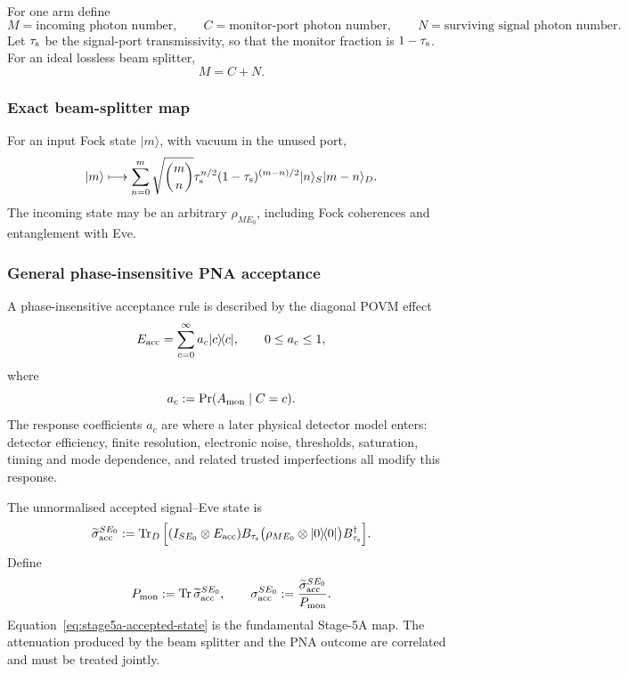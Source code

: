 \documentclass[11pt]{article}
\theoremstyle{remark}
\begin{document}
For one arm define
\[
    M=\text{incoming photon number},\qquad
    C=\text{monitor-port photon number},\qquad
    N=\text{surviving signal photon number}.
\]
Let \(\tau_{\rm s}\) be the signal-port transmissivity, so that the monitor
fraction is \(1-\tau_{\rm s}\).  For an ideal lossless beam splitter,
\[
    M=C+N.
\]

\subsubsection{Exact beam-splitter map}

For an input Fock state \(|m\rangle\), with vacuum in the unused port,
\begin{equation}
    |m\rangle
    \longmapsto
    \sum_{n=0}^{m}
    \sqrt{\binom mn}
    \tau_{\rm s}^{n/2}
    (1-\tau_{\rm s})^{(m-n)/2}
    |n\rangle_S|m-n\rangle_D .
    \label{eq:stage5a-bs-map}
\end{equation}
The incoming state may be an arbitrary
\(\rho_{ME_0}\), including Fock coherences and entanglement with Eve.

\subsubsection{General phase-insensitive PNA acceptance}

A phase-insensitive acceptance rule is described by the diagonal POVM effect
\begin{equation}
    E_{\rm acc}
    =
    \sum_{c=0}^{\infty}a_c|c\rangle\!\langle c|,
    \qquad
    0\le a_c\le1,
    \label{eq:stage5a-accept-effect}
\end{equation}
where
\[
    a_c
    :=
    \Pr(A_{\rm mon}\mid C=c).
\]
The response coefficients \(a_c\) are where a later physical detector model
enters: detector efficiency, finite resolution, electronic noise, thresholds,
saturation, timing and mode dependence, and related trusted imperfections all
modify this response.

The unnormalised accepted signal--Eve state is
\begin{equation}
\begin{aligned}
    \widetilde\sigma_{\rm acc}^{SE_0}
    :=
    \operatorname{Tr}_{D}
    \Big[
      (I_{SE_0}\otimes E_{\rm acc})
      B_{\tau_{\rm s}}
      \big(
        \rho_{ME_0}\otimes|0\rangle\!\langle0|
      \big)
      B_{\tau_{\rm s}}^\dagger
    \Big].
    \label{eq:stage5a-accepted-state}
\end{aligned}
\end{equation}
Define
\begin{equation}
    P_{\rm mon}
    :=
    \operatorname{Tr}\widetilde\sigma_{\rm acc}^{SE_0},
    \qquad
    \sigma_{\rm acc}^{SE_0}
    :=
    \frac{\widetilde\sigma_{\rm acc}^{SE_0}}{P_{\rm mon}}.
    \label{eq:stage5a-normalized-state}
\end{equation}
Equation~\eqref{eq:stage5a-accepted-state} is the fundamental Stage-5A map.
The attenuation produced by the beam splitter and the PNA outcome are
correlated and must be treated jointly.
\end{document}
